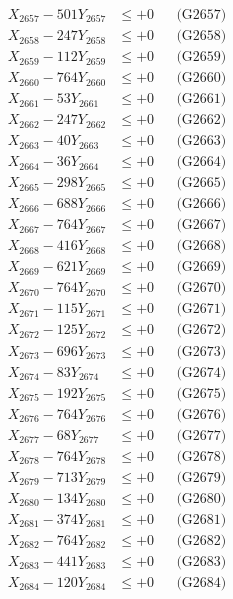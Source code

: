 \documentclass[a4paper,10pt]{article}
\begin{document}
{\begin{align}
X_{2657} - 501Y_{2657} &\leq +0 && \text{(G2657)} \\
X_{2658} - 247Y_{2658} &\leq +0 && \text{(G2658)} \\
X_{2659} - 112Y_{2659} &\leq +0 && \text{(G2659)} \\
X_{2660} - 764Y_{2660} &\leq +0 && \text{(G2660)} \\
\allowbreak
X_{2661} - 53Y_{2661} &\leq +0 && \text{(G2661)} \\
X_{2662} - 247Y_{2662} &\leq +0 && \text{(G2662)} \\
X_{2663} - 40Y_{2663} &\leq +0 && \text{(G2663)} \\
X_{2664} - 36Y_{2664} &\leq +0 && \text{(G2664)} \\
X_{2665} - 298Y_{2665} &\leq +0 && \text{(G2665)} \\
X_{2666} - 688Y_{2666} &\leq +0 && \text{(G2666)} \\
X_{2667} - 764Y_{2667} &\leq +0 && \text{(G2667)} \\
X_{2668} - 416Y_{2668} &\leq +0 && \text{(G2668)} \\
X_{2669} - 621Y_{2669} &\leq +0 && \text{(G2669)} \\
X_{2670} - 764Y_{2670} &\leq +0 && \text{(G2670)} \\
\allowbreak
X_{2671} - 115Y_{2671} &\leq +0 && \text{(G2671)} \\
X_{2672} - 125Y_{2672} &\leq +0 && \text{(G2672)} \\
X_{2673} - 696Y_{2673} &\leq +0 && \text{(G2673)} \\
X_{2674} - 83Y_{2674} &\leq +0 && \text{(G2674)} \\
X_{2675} - 192Y_{2675} &\leq +0 && \text{(G2675)} \\
X_{2676} - 764Y_{2676} &\leq +0 && \text{(G2676)} \\
X_{2677} - 68Y_{2677} &\leq +0 && \text{(G2677)} \\
X_{2678} - 764Y_{2678} &\leq +0 && \text{(G2678)} \\
X_{2679} - 713Y_{2679} &\leq +0 && \text{(G2679)} \\
X_{2680} - 134Y_{2680} &\leq +0 && \text{(G2680)} \\
\allowbreak
X_{2681} - 374Y_{2681} &\leq +0 && \text{(G2681)} \\
X_{2682} - 764Y_{2682} &\leq +0 && \text{(G2682)} \\
X_{2683} - 441Y_{2683} &\leq +0 && \text{(G2683)} \\
X_{2684} - 120Y_{2684} &\leq +0 && \text{(G2684)} \\

\end{align}}
\end{document}
